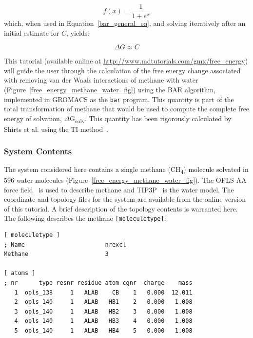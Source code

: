 \documentclass[9pt,tutorial,pubversion]{livecoms}
\newcommand{\urlstring}{http://www.mdtutorials.com/gmx}
\newcommand{\tutorialfes}{\url{\urlstring/free_energy}}
\begin{document}
\begin{equation} \label{bar_fermi_eq}
f(x) = \frac{1}{1 + e^x}
\end{equation}
%
which, when used in Equation~\ref{bar_general_eq}, and solving iteratively after an initial estimate for $C$, yields:

\begin{equation} \label{bar_final_eq}
\Delta G \approx C
\end{equation}

This tutorial (available online at \tutorialfes) will guide the user through the calculation of the free energy change associated with removing van der Waals interactions of methane with water (Figure~\ref{free_energy_methane_water_fig}) using the BAR algorithm, implemented in GROMACS as the \texttt{bar} program. This quantity is part of the total transformation of methane that would be used to compute the complete free energy of solvation, $\Delta$G\textsubscript{solv}. This quantity has been rigorously calculated by Shirts et al. using the TI method~\cite{Shirts2003}.

\subsubsection{System Contents} \label{fes_top}

The system considered here contains a single methane (CH\textsubscript4) molecule solvated in 596 water molecules (Figure~\ref{free_energy_methane_water_fig}). The OPLS-AA force field~\cite{Kaminski2001} is used to describe methane and TIP3P~\cite{Jorgensen1983} is the water model. The coordinate and topology files for the system are available from the online version of this tutorial. A brief description of the topology contents is warranted here. The following describes the methane \texttt{[moleculetype]}:

\begin{lstlisting}[basicstyle=\footnotesize\ttfamily]
[ moleculetype ]
; Name                       nrexcl
Methane                      3

[ atoms ]
; nr      type resnr residue atom cgnr  charge    mass
   1  opls_138     1   ALAB    CB    1   0.000  12.011   
   2  opls_140     1   ALAB   HB1    2   0.000   1.008   
   3  opls_140     1   ALAB   HB2    3   0.000   1.008   
   4  opls_140     1   ALAB   HB3    4   0.000   1.008   
   5  opls_140     1   ALAB   HB4    5   0.000   1.008
\end{lstlisting}
\end{document}
